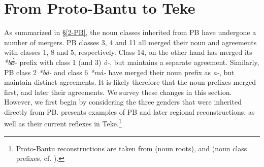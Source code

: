 \documentclass[output=paper,,modfonts,nonflat]{langsci/langscibook}
\begin{document}


\section{From Proto-Bantu to Teke} 
\label{4-PB-Teke}

As summarized in \S\ref{2-PB}, the noun classes inherited from PB have undergone a number of mergers. PB classes 3, 4 and 11 all merged their noun and agreements with classes 1, 8 and 5, respectively. Class 14, on the other hand has merged its \textit{*bʊ̀-} prefix with class 1 (and 3) \textit{ò-}, but maintains a separate agreement. Similarly, PB class 2 \textit{*bà-} and class 6 \textit{*mà-} have merged their noun prefix as \textit{a-}, but maintain distinct agreements. It is likely therefore that the noun prefixes merged first, and later their agreements. We survey these changes in this section. However, we first begin by considering the three genders that were inherited directly from PB.  presents examples of PB and later regional reconstructions, as well as their current reflexes in Teke.\footnote{Proto-Bantu reconstructions are taken from \citet{Bastinetal2002} (noun roots), and \citet{Meeussen1967} (noun class prefixes, cf. ).}
\end{document}
